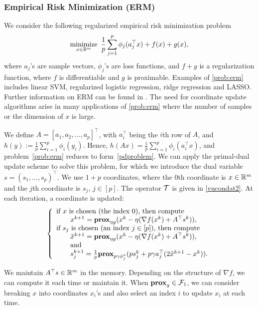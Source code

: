 \subsubsection{Empirical Risk Minimization (ERM)}
We consider the following regularized empirical risk minimization problem
\begin{equation}\label{prob:erm}
\Min_{x\in\RR^m}~ \frac{1}{p}\sum_{j=1}^p\phi_j(a_j^\top x)+f(x)+g(x),
\end{equation}
where $a_j$'s are sample vectors, $\phi_j$'s are loss functions, and $f+g$ is a regularization function, where $f$ is differentiable and $g$ is proximable. Examples of \eqref{prob:erm} includes linear SVM, regularized logistic regression, ridge regression and LASSO. Further information on ERM can be found in \cite{hastie2005elements}. The need for coordinate update algorithms arise in many applications of \eqref{prob:erm} where the number of samples or the dimension of $x$ is large. 

We define $A=[a_1,a_2,...,a_p]^\top$, with $a_i^{\top}$ being the $i$th row of $A$, and $h(y):=\frac{1}{p}\sum_{i=1}^p\phi_i(y_i)$. Hence, $h(Ax)=\frac{1}{p}\sum_{i=1}^p\phi_i(a_i^\top x)$, and problem~\eqref{prob:erm} reduces to form~\eqref{pdproblem}.
We can apply the primal-dual update scheme to solve this problem, for which we introduce the dual variable $s = (s_1, ..., s_p)^\top$. We use $1+p$ coordinates, where the $0$th coordinate is $x\in\mathbb{R}^m$ and the $j$th coordinate is $s_j$, $j\in [p]$. The operator ${\mathcal{T}}$ is given in \eqref{vucondat2}. At each iteration, a coordinate is updated:
\begin{equation}
{\left\{
\begin{array}{l}
\text{if }x\text{ is chosen (the index 0), then compute}\\
\qquad {x}^{k+1}=\prox_{\eta g}(x^k-\eta(\nabla f(x^k)+A^\top s^k)),\\
\text{if }s_j\text{ is chosen (an index $j \in [p]$), then compute}\\
\qquad\tilde{x}^{k+1}=\prox_{\eta g}(x^k-\eta(\nabla f(x^k)+A^\top s^k)),\\
\qquad\text{and}\\
\qquad{s}_j^{k+1}=\frac{1}{p}\prox_{p\gamma \phi_j^*} (ps_j^k+p\gamma a_j^\top(2\tilde{x}^{k+1}-x^k)).
\end{array}
\right.
}\end{equation}

We maintain $A^\top s\in \mathbb{R}^m$ in the memory. Depending on the structure of $\nabla f$, we can compute it each time or maintain it. When $\mathbf{prox}_g\in{\mathcal{F}}_1$, we can consider breaking $x$ into coordinates $x_i$'s and also select an index $i$ to update $x_i$ at each time.
